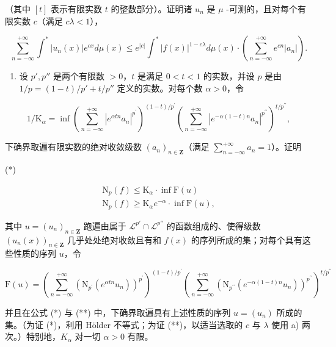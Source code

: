（其中 \([t]\) 表示有限实数 \(t\) 的整数部分）。证明诸 \(u_{n}\) 是 \(\mu\) -可测的，且对每个有限实数 \(c\)（满足 \(c\lambda < 1\)），

\[
\sum_ {n = - \infty} ^ {+ \infty} \int^ {*} | u _ {n} (x) | e ^ {c x} d \mu (x) \leqslant e ^ {| c |} \int^ {*} | f (x) | ^ {1 - c \lambda} d \mu (x) \cdot \left(\sum_ {n = - \infty} ^ {+ \infty} e ^ {c n} | a _ {n} |\right).
\]

\begin{enumerate}
\def\labelenumi{\alph{enumi})}
\setcounter{enumi}{1}
\tightlist
\item
  设 \(p', p''\) 是两个有限数 \(> 0\)，\(t\) 是满足 \(0 < t < 1\) 的实数，并设 \(p\) 是由 \(1/p = (1 - t)/p' + t/p''\) 定义的实数。对每个数 \(\alpha > 0\)，令
\end{enumerate}

\[
1 / \mathrm{K} _ {\alpha} = \inf \left(\sum_ {n = - \infty} ^ {+ \infty} | e ^ {\alpha t n} a _ {n} | ^ {p ^ {\prime}}\right) ^ {(1 - t) / p ^ {\prime}} \left(\sum_ {n = - \infty} ^ {+ \infty} | e ^ {- \alpha (1 - t) n} a _ {n} | ^ {p ^ {\prime \prime}}\right) ^ {t / p ^ {\prime \prime}},
\]

下确界取遍有限实数的绝对收敛级数 \((a_{n})_{n\in \mathbf{Z}}\)（满足 \(\sum_{n = -\infty}^{+\infty}a_n = 1\)）。证明

(*)

\[
\begin{array}{l} \mathrm{N} _ {p} (f) \leqslant \mathrm{K} _ {\alpha} \cdot \inf \mathrm{F} (u) \\ \mathrm{N} _ {p} (f) \geqslant \mathrm{K} _ {\alpha} e ^ {- \alpha} \cdot \inf \mathrm{F} (u), \end{array}\tag{**}
\]

其中 \(u = (u_n)_{n \in \mathbf{Z}}\) 跑遍由属于 \(\mathcal{L}^{p'} \cap \mathcal{L}^{p''}\) 的函数组成的、使得级数 \((u_n(x))_{n \in \mathbf{Z}}\) 几乎处处绝对收敛且有和 \(f(x)\) 的序列所成的集；对每个具有这些性质的序列 \(u\)，令

\[
\mathrm{F} (u) = \left(\sum_ {n = - \infty} ^ {+ \infty} \left(\mathrm{N} _ {p ^ {\prime}} (e ^ {\alpha t n} u _ {n})\right) ^ {p ^ {\prime}}\right) ^ {(1 - t) / p ^ {\prime}} \left(\sum_ {n = - \infty} ^ {+ \infty} \left(\mathrm{N} _ {p ^ {\prime \prime}} (e ^ {- \alpha (1 - t) n} u _ {n})\right) ^ {p ^ {\prime \prime}}\right) ^ {t / p ^ {\prime \prime}}
\]

并且在公式 (*) 与 (**) 中，下确界取遍具有上述性质的序列 \(u = (u_n)\) 所成的集。（为证 (*)，利用 Hölder 不等式；为证 (**)，以适当选取的 \(c\) 与 \(\lambda\) 使用 a) 两次。）特别地，\(K_{\alpha}\) 对一切 \(\alpha > 0\) 有限。

